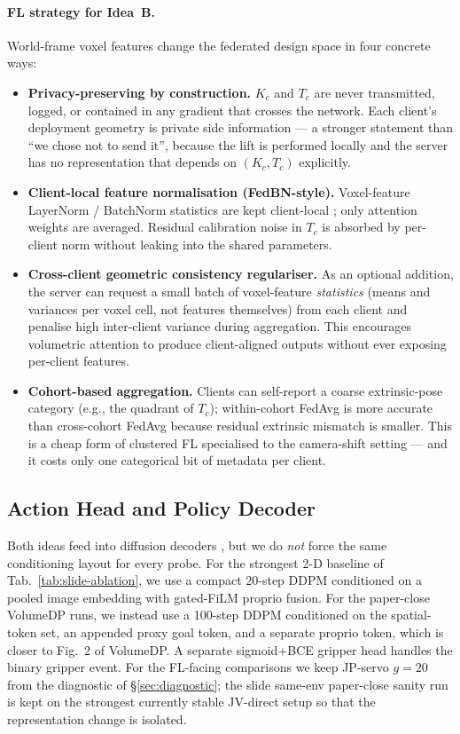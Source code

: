 \documentclass{article}
\begin{document}
\paragraph{FL strategy for Idea~B.}
World-frame voxel features change the federated design space in
four concrete ways:
\begin{itemize}\setlength{\itemsep}{1pt}
\item \textbf{Privacy-preserving by construction.} $K_c$ and
$T_c$ are never transmitted, logged, or contained in any gradient
that crosses the network. Each client's deployment geometry is
private side information --- a stronger statement than ``we
chose not to send it'', because the lift is performed locally and
the server has no representation that depends on $(K_c, T_c)$
explicitly.
\item \textbf{Client-local feature normalisation (FedBN-style).}
Voxel-feature LayerNorm / BatchNorm statistics are kept
client-local \cite{fedbn}; only attention weights are averaged.
Residual calibration noise in $T_c$ is absorbed by per-client
norm without leaking into the shared parameters.
\item \textbf{Cross-client geometric consistency
regulariser.} As an optional addition, the server can request a
small batch of voxel-feature \emph{statistics} (means and
variances per voxel cell, not features themselves) from each
client and penalise high inter-client variance during
aggregation. This encourages volumetric attention to produce
client-aligned outputs without ever exposing per-client features.
\item \textbf{Cohort-based aggregation.} Clients can self-report
a coarse extrinsic-pose category (e.g., the quadrant of $T_c$);
within-cohort FedAvg is more accurate than cross-cohort FedAvg
because residual extrinsic mismatch is smaller. This is a cheap
form of clustered FL \cite{cluster_fl} specialised to the
camera-shift setting --- and it costs only one categorical bit
of metadata per client.
\end{itemize}

\subsection{Action Head and Policy Decoder}
\label{sec:action-head}
Both ideas feed into diffusion decoders \cite{diffpolicy}, but we
do \emph{not} force the same conditioning layout for every probe.
For the strongest 2-D baseline of Tab.~\ref{tab:slide-ablation},
we use a compact 20-step DDPM conditioned on a pooled image
embedding with gated-FiLM proprio fusion. For the paper-close
VolumeDP runs, we instead use a 100-step DDPM conditioned on the
spatial-token set, an appended proxy goal token, and a separate
proprio token, which is closer to Fig.~2 of VolumeDP. A separate
sigmoid+BCE gripper head handles the binary gripper event. For the
FL-facing comparisons we keep JP-servo $g\!=\!20$ from the
diagnostic of \S\ref{sec:diagnostic}; the slide same-env
paper-close sanity run is kept on the strongest currently stable
JV-direct setup so that the representation change is isolated.
\end{document}
